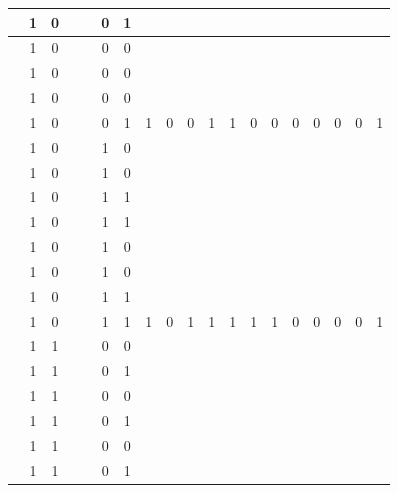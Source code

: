 \begin{table}[!tb]
\begin{tabular}{|c|c|c|c|c|c|c|c|c|c|c|c|c|c|c|c|c|c|c|}
        \rowcolor{yellow!40}  & 1 & 0 &  &  & 0 & 1 &  &  &  &  &  &  &  &  &  &  &  &  \\ \hline
        \rowcolor{yellow!40}  & 1 & 0 &  &  & 0 & 0 &  &  &  &  &  &  &  &  &  &  &  &  \\ \hline
        \rowcolor{yellow!40}  & 1 & 0 &  &  & 0 & 0 &  &  &  &  &  &  &  &  &  &  &  &  \\ \hline
        \rowcolor{yellow!40}  & 1 & 0 &  &  & 0 & 0 &  &  &  &  &  &  &  &  &  &  &  &  \\ \hline
        \rowcolor{yellow!40}  & 1 & 0 &  &  & 0 & 1 & 1 & 0 & 0 & 1 & 1 & 0 & 0 & 0 & 0 & 0 & 0 & 1 \\ \hline
        \rowcolor{gray!40}  & 1 & 0 &  &  & 1 & 0 &  &  &  &  &  &  &  &  &  &  &  &  \\ \hline
        \rowcolor{gray!40}  & 1 & 0 &  &  & 1 & 0 &  &  &  &  &  &  &  &  &  &  &  &  \\ \hline
        \rowcolor{gray!40}  & 1 & 0 &  &  & 1 & 1 &  &  &  &  &  &  &  &  &  &  &  &  \\ \hline
        \rowcolor{gray!40}  & 1 & 0 &  &  & 1 & 1 &  &  &  &  &  &  &  &  &  &  &  &  \\ \hline
        \rowcolor{gray!40}  & 1 & 0 &  &  & 1 & 0 &  &  &  &  &  &  &  &  &  &  &  &  \\ \hline
        \rowcolor{gray!40}  & 1 & 0 &  &  & 1 & 0 &  &  &  &  &  &  &  &  &  &  &  &  \\ \hline
        \rowcolor{gray!40}  & 1 & 0 &  &  & 1 & 1 &  &  &  &  &  &  &  &  &  &  &  &  \\ \hline
        \rowcolor{gray!40}  & 1 & 0 &  &  & 1 & 1 & 1 & 0 & 1 & 1 & 1 & 1 & 1 & 0 & 0 & 0 & 0 & 1 \\ \hline
        \rowcolor{blue!40}  & 1 & 1 &  &  & 0 & 0 &  &  &  &  &  &  &  &  &  &  &  &  \\ \hline
        \rowcolor{blue!40}  & 1 & 1 &  &  & 0 & 1 &  &  &  &  &  &  &  &  &  &  &  &  \\ \hline
        \rowcolor{blue!40}  & 1 & 1 &  &  & 0 & 0 &  &  &  &  &  &  &  &  &  &  &  &  \\ \hline
        \rowcolor{blue!40}  & 1 & 1 &  &  & 0 & 1 &  &  &  &  &  &  &  &  &  &  &  &  \\ \hline
        \rowcolor{blue!40}  & 1 & 1 &  &  & 0 & 0 &  &  &  &  &  &  &  &  &  &  &  &  \\ \hline
        \rowcolor{blue!40}  & 1 & 1 &  &  & 0 & 1 &  &  &  &  &  &  &  &  &  &  &  &  \\ \hline

\end{tabular}
\end{table}
